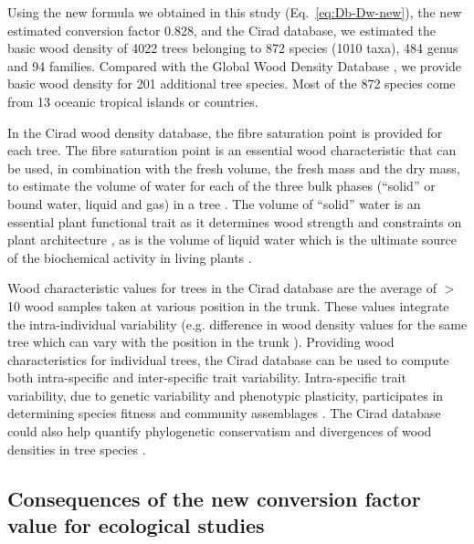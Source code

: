 \documentclass[a4paper, 12pt, leqno, dvipsnames]{article}\usepackage[]{graphicx}\usepackage[]{color}
\begin{document}
Using the new formula we obtained in this study (Eq.~\ref{eq:Db-Dw-new}), the new estimated conversion factor 0.828, and the Cirad database, we estimated the basic wood density of 4022 trees belonging to 872 species (1010 taxa), 484 genus and 94 families. Compared with the Global Wood Density Database \citep{Zanne2009}, we provide basic wood density for 201 additional tree species. Most of the 872 species come from 13 oceanic tropical islands or countries.

In the Cirad wood density database, the fibre saturation point is provided for each tree. The fibre saturation point is an essential wood characteristic that can be used, in combination with the fresh volume, the fresh mass and the dry mass, to estimate the volume of water for each of the three bulk phases (``solid'' or bound water, liquid and gas) in a tree \citep{Berry2005}. The volume of ``solid'' water is an essential plant functional trait as it determines wood strength and constraints on plant architecture \citep{Niklas1993}, as is the volume of liquid water which is the ultimate source of the biochemical activity in living plants \citep{Berry2005}.

Wood characteristic values for trees in the Cirad database are the average of $>$10 wood samples taken at various position in the trunk. These values integrate the intra-individual variability (e.g. difference in wood density values for the same tree which can vary with the position in the trunk \citep{Bastin2015}). Providing wood characteristics for individual trees, the Cirad database can be used to compute both intra-specific and inter-specific trait variability. Intra-specific trait variability, due to genetic variability and phenotypic plasticity, participates in determining species fitness and community assemblages \citep{Courbaud2012, Albert2011, Roughgarden1979}. The Cirad database could also help quantify phylogenetic conservatism and divergences of wood densities in tree species \citep{Flores2011}.

\subsection{Consequences of the new conversion factor value for ecological studies}
\end{document}
